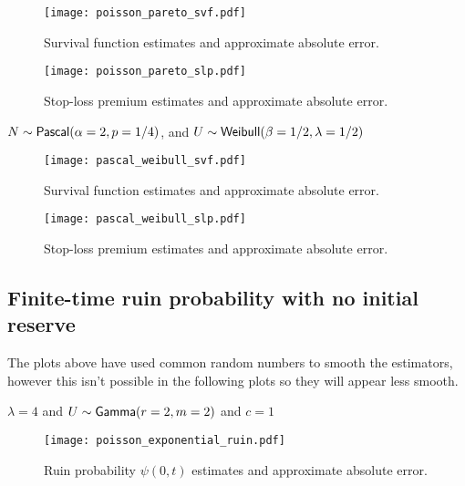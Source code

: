 \begin{figure}[H]
\centering
\texttt{[image: poisson\_pareto\_svf.pdf]}
\caption{Survival function estimates and approximate absolute error.}
\end{figure}

\begin{figure}[H]
\centering
\texttt{[image: poisson\_pareto\_slp.pdf]}
\caption{Stop-loss premium estimates and approximate absolute error.}
\end{figure}

\begin{test} $N \sim \mathsf{Pascal}(\alpha=2,p=1/4)$, and $U \sim \mathsf{Weibull}(\beta=1/2,\lambda=1/2)$
\end{test}

\begin{figure}[H]
\centering
\texttt{[image: pascal\_weibull\_svf.pdf]}
\caption{Survival function estimates and approximate absolute error.}
\end{figure}

\begin{figure}[H]
\centering
\texttt{[image: pascal\_weibull\_slp.pdf]}
\caption{Stop-loss premium estimates and approximate absolute error.}
\end{figure}


\subsection{Finite-time ruin probability with no initial reserve} \label{subsec:ApproximationFiniteTimeRuinProbability}



The plots above have used common random numbers to smooth the estimators, however this isn't possible in the following plots so they will appear less smooth.

\begin{test}
$\lambda=4$ and $U\sim\mathsf{Gamma}(r=2,m=2)$ and $c=1$
\end{test}


\begin{figure}[H]
\centering
\texttt{[image: poisson\_exponential\_ruin.pdf]}
\caption{Ruin probability $\psi(0, t)$ estimates and approximate absolute error.}
\end{figure}


